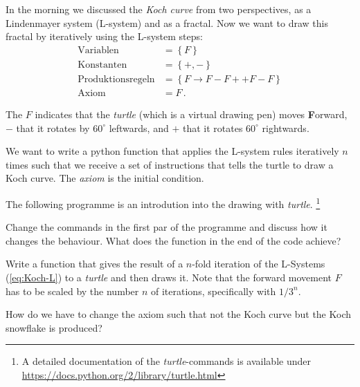 \exercise[
    topic = Fractals and Self-similarity
]


In the morning we discussed the \emph{Koch curve} from two perspectives, as a Lindenmayer system (L-system) and as a fractal. Now we want to draw this fractal by iteratively using the L-system steps:
\begin{subequations}
\label{eq:Koch-L}
\begin{align}
    \mathrm{Variablen} &= \left\{F\right\} \\
    \mathrm{Konstanten} &= \left\{+,-\right\} \\
    \mathrm{Produktionsregeln} &= \left\{F\rightarrow F-F++F-F\right\} \\
    \mathrm{Axiom} &= F\,.
\end{align}
\end{subequations}

The $F$ indicates that the \emph{turtle} (which is a virtual drawing pen) moves {\bf F}orward, $-$ that it rotates by $60^\circ$ leftwards, and $+$ that it rotates $60^\circ$  rightwards.

\subexercise[
    topic = Iterative Application of the L-system
]
    \label{ex:L-Koch}
    
    
    We want to write a python function that applies the L-system rules iteratively $n$ times such that we receive a set of instructions that tells the turtle to draw a Koch curve. The \emph{axiom} is the initial condition.
    
\subexercise[
    topic = Teenage Mutant L-System Turtle
    ]

The following programme is an introdution into the drawing with \textit{turtle}. \footnote{A detailed documentation of the \textit{turtle}-commands is available under
        \url{https://docs.python.org/2/library/turtle.html}
    }

Change the commands in the first par of the programme and discuss how it changes the behaviour. What does the function in the end of the code achieve?
    

\subexercise[
    topic = Drawing a Koch curve
    ]


Write a function that gives the result of a $n$-fold iteration of the L-Systems (\ref{eq:Koch-L}) to a \emph{turtle} and then draws it. Note that the forward movement $F$ has to be scaled by the number $n$ of iterations, specifically with $1/3^n$.


How do we have to change the axiom such that not the Koch curve but the Koch snowflake is produced?

